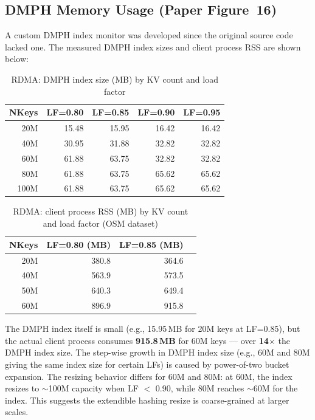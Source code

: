 \documentclass[conference]{IEEEtran}
\begin{document}
\subsection{DMPH Memory Usage (Paper Figure~16)}\label{sec:repro-memory}

A custom DMPH index monitor was developed since the original source code lacked one. The measured DMPH index sizes and client process RSS are shown below:

\begin{table}[H]
\centering
\caption{RDMA: DMPH index size (MB) by KV count and load factor}
\label{tab:rdma-dmph}
\small
\begin{tabular}{@{}rrrrr@{}}
\toprule
\textbf{NKeys} & \textbf{LF=0.80} & \textbf{LF=0.85} & \textbf{LF=0.90} & \textbf{LF=0.95} \\
\midrule
20M  & 15.48 & 15.95 & 16.42 & 16.42 \\
40M  & 30.95 & 31.88 & 32.82 & 32.82 \\
60M  & 61.88 & 63.75 & 32.82 & 32.82 \\
80M  & 61.88 & 63.75 & 65.62 & 65.62 \\
100M & 61.88 & 63.75 & 65.62 & 65.62 \\
\bottomrule
\end{tabular}
\end{table}

\begin{table}[H]
\centering
\caption{RDMA: client process RSS (MB) by KV count and load factor (OSM dataset)}
\label{tab:rdma-rss}
\small
\begin{tabular}{@{}rrrr@{}}
\toprule
\textbf{NKeys} & \textbf{LF=0.80 (MB)} & \textbf{LF=0.85 (MB)} \\
\midrule
20M  & 380.8 & 364.6 \\
40M  & 563.9 & 573.5 \\
50M  & 640.3 & 649.4 \\
60M  & 896.9 & 915.8 \\
\bottomrule
\end{tabular}
\end{table}

The DMPH index itself is small (e.g., 15.95\,MB for 20M keys at LF=0.85), but the actual client process consumes \textbf{915.8\,MB} for 60M keys --- over \textbf{14$\times$} the DMPH index size. The step-wise growth in DMPH index size (e.g., 60M and 80M giving the same index size for certain LFs) is caused by power-of-two bucket expansion. The resizing behavior differs for 60M and 80M: at 60M, the index resizes to $\sim$100M capacity when LF $<$ 0.90, while 80M reaches $\sim$60M for the index. This suggests the extendible hashing resize is coarse-grained at larger scales.
\end{document}
